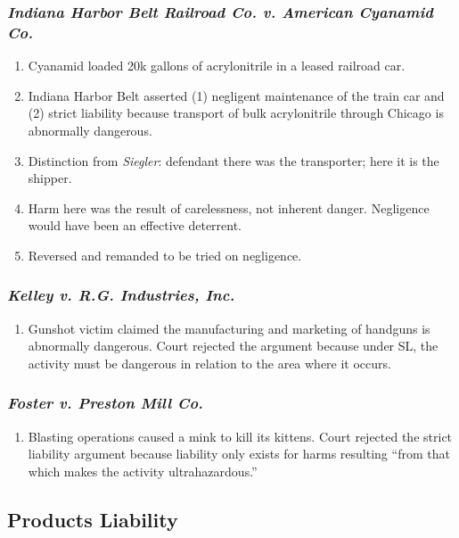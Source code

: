 \subsubsection{\emph{Indiana Harbor Belt Railroad Co. v. American Cyanamid Co.}}

\begin{enumerate}
    \item Cyanamid loaded 20k gallons of acrylonitrile in a leased railroad car.
    \item Indiana Harbor Belt asserted (1) negligent maintenance of the train 
    car and (2) strict liability because transport of bulk acrylonitrile through 
    Chicago is abnormally dangerous.
    \item Distinction from \emph{Siegler}: defendant there was the transporter; 
    here it is the shipper.
    \item Harm here was the result of carelessness, not inherent danger.  
    Negligence would have been an effective deterrent.
    \item Reversed and remanded to be tried on negligence.
\end{enumerate}

\subsubsection{\emph{Kelley v. R.G. Industries, Inc.}}

\begin{enumerate}
    \item Gunshot victim claimed the manufacturing and marketing of handguns is 
    abnormally dangerous. Court rejected the argument because under SL, the 
    activity must be dangerous in relation to the area where it occurs.
\end{enumerate}

\subsubsection{\emph{Foster v. Preston Mill Co.}}

\begin{enumerate}
    \item Blasting operations caused a mink to kill its kittens. Court rejected 
    the strict liability argument because liability only exists for harms 
    resulting ``from that which makes the activity ultrahazardous.''
\end{enumerate}

\subsection{Products Liability}

